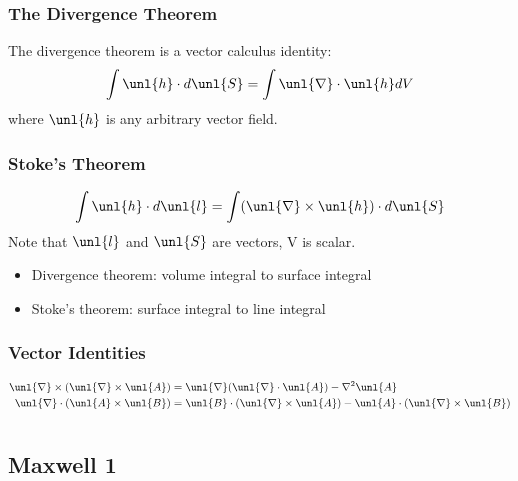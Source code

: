 \documentclass[a4paper, 11pt, normalem]{report}
\renewcommand\del{\unl{\nabla}}
\newcommand\A{\unl{A}}
\begin{document}
\subsection{The Divergence Theorem}
The divergence theorem is a vector calculus identity:
\begin{equation}
    \int \unl{h}\cdot d\unl{S} = \int \del \cdot \unl{h}dV
\end{equation}
where $\unl{h}$ is any arbitrary vector field.

\subsection{Stoke's Theorem}
\begin{equation}
    \int \unl{h}\cdot d\unl{l} = \int (\del \times \unl{h}) \cdot d\unl{S}
\end{equation}
Note that $\unl{l}$ and $\unl{S}$ are vectors, V is scalar.
\begin{itemize}
    \item Divergence theorem: volume integral to surface integral
    \item Stoke's theorem: surface integral to line integral
\end{itemize}

\subsection{Vector Identities}
\begin{align}
    \del \times (\del \times \A) &= \del(\del \cdot \A) - \nabla^2 \A \\
    \del \cdot (\A \times \unl{B}) &= \unl{B}\cdot(\del \times \A) - \A \cdot (\del \times \unl{B})
\end{align}

\chapter{}
\section{Maxwell 1}
\end{document}
